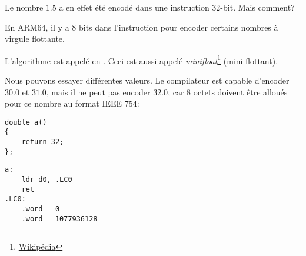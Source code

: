 Le nombre $1.5$ a en effet été encodé dans une instruction 32-bit.
Mais comment?

En ARM64, il y a 8 bits dans l'instruction  pour encoder certains nombres
à virgule flottante.

L'algorithme est appelé  en \ARMSixFourRefURL.
Ceci est aussi appelé \emph{minifloat}\footnote{\href{http://en.wikipedia.org/wiki/Minifloat}{Wikipédia}}
(mini flottant).

Nous pouvons essayer différentes valeurs. Le compilateur est capable d'encoder $30.0$
et $31.0$, mais il ne peut pas encoder $32.0$, car 8 octets doivent être alloués
pour ce nombre au format IEEE 754:

\begin{lstlisting}[style=customc]
double a()
{
	return 32;
};
\end{lstlisting}

\begin{lstlisting}[caption=GCC 4.9.1 -O3,style=customasmARM]
a:
	ldr	d0, .LC0
	ret
.LC0:
	.word	0
	.word	1077936128
\end{lstlisting}
